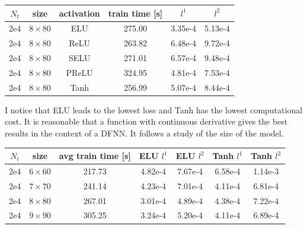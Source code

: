 \documentclass[11pt]{article}
\begin{document}
\begin{center}
\begin{tabular}{ c|c|c|c|c|c } 
 $N_t$ & size & activation & train time [s] & $l^1$ & $l^2$ \\ 
 \hline
 2e4 & $8\times 80$ & ELU & 275.00 &  3.35e-4 & 5.13e-4\\
 2e4 & $8\times 80$ & ReLU & 263.82 & 6.48e-4 & 9.72e-4\\
 2e4 & $8\times 80$ & SELU & 271.01 &  6.57e-4 & 9.48e-4 \\
 2e4 & $8\times 80$ & PReLU & 324.95 &  4.81e-4 & 7.53e-4 \\
 2e4 & $8\times 80$ & Tanh & 256.99 &  5.07e-4 & 8.44e-4 \\
\end{tabular}
\end{center}

I notice that ELU leads to the lowest loss and Tanh has the lowest computational cost. It is reasonable that a function with continuous derivative gives the best results in the context of a DFNN. It follows a study of the size of the model.

\begin{center}
\begin{tabular}{ c|c|c|c|c|c|c } 
 $N_t$ & size & avg train time [s] & ELU $l^1$ & ELU $l^2$ & Tanh $l^1$ & Tanh $l^2$ \\ 
 \hline
 2e4 & $6\times 60$ & 217.73 & 4.82e-4 & 7.67e-4 & 6.58e-4 & 1.14e-3\\
 2e4 & $7\times 70$ & 241.14 & 4.23e-4 & 7.01e-4 & 4.11e-4 & 6.81e-4\\
 2e4 & $8\times 80$ & 267.01 & 3.01e-4 & 4.89e-4 & 4.38e-4 & 7.22e-4 \\
 2e4 & $9\times 90$ & 305.25 & 3.24e-4 & 5.20e-4 & 4.11e-4 & 6.89e-4 \\
\end{tabular}
\end{center}
\end{document}
